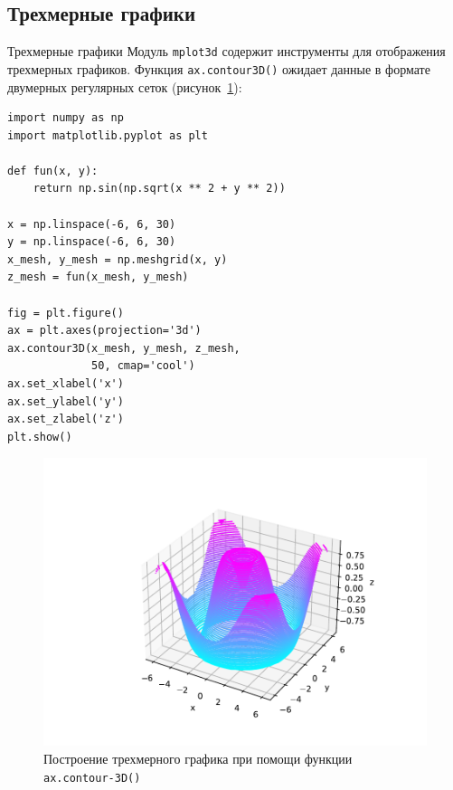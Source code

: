 \documentclass[aspectratio=169, mathserif]{beamer}	%
\begin{document}
\subsection{Трехмерные графики}
\begin{frame}[fragile, label=m]{Трехмерные графики}
\scriptsize
Модуль \texttt{mplot3d} содержит инструменты для отображения трехмерных графиков. Функция \texttt{ax.contour3D()} ожидает данные в формате двумерных регулярных сеток (рисунок~\ref{fig:fig_24}):
\vfill
\begin{minipage}{.4\textwidth}
\begin{verbatim}
import numpy as np
import matplotlib.pyplot as plt

def fun(x, y):
    return np.sin(np.sqrt(x ** 2 + y ** 2))

x = np.linspace(-6, 6, 30)
y = np.linspace(-6, 6, 30)
x_mesh, y_mesh = np.meshgrid(x, y)
z_mesh = fun(x_mesh, y_mesh)

fig = plt.figure()
ax = plt.axes(projection='3d')
ax.contour3D(x_mesh, y_mesh, z_mesh,
             50, cmap='cool')
ax.set_xlabel('x')
ax.set_ylabel('y')
ax.set_zlabel('z')
plt.show()
\end{verbatim}
\end{minipage}
\begin{minipage}{.09\textwidth}
\hfill
\end{minipage}
\begin{minipage}{.5\textwidth}
\begin{figure}[h!]
	\centering
	\includegraphics[width=.87\linewidth]{./pics/Figure_24}
	\caption{Построение трехмерного графика при помощи функции \texttt{ax.contour-3D()}}
	\label{fig:fig_24}
\end{figure}
\end{minipage}
\vfill
\end{frame}


\end{document}

